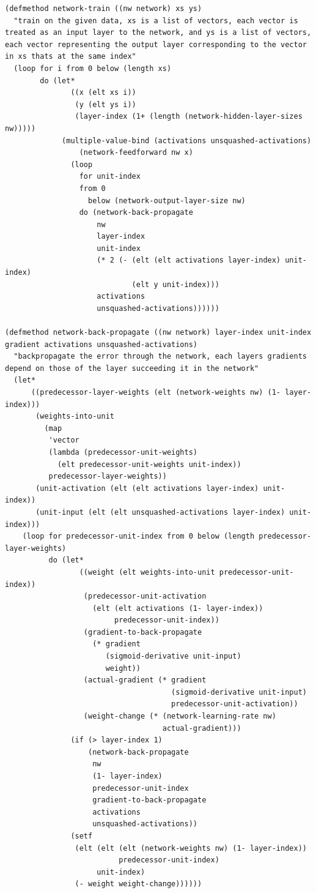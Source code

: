 \documentclass[a4paper,12pt]{article}
\begin{document}
\begin{lstlisting}
(defmethod network-train ((nw network) xs ys)
  "train on the given data, xs is a list of vectors, each vector is treated as an input layer to the network, and ys is a list of vectors, each vector representing the output layer corresponding to the vector in xs thats at the same index"
  (loop for i from 0 below (length xs)
        do (let*
               ((x (elt xs i))
                (y (elt ys i))
                (layer-index (1+ (length (network-hidden-layer-sizes nw)))))
             (multiple-value-bind (activations unsquashed-activations)
                 (network-feedforward nw x)
               (loop
                 for unit-index
                 from 0
                   below (network-output-layer-size nw)
                 do (network-back-propagate
                     nw
                     layer-index
                     unit-index
                     (* 2 (- (elt (elt activations layer-index) unit-index)
                             (elt y unit-index)))
                     activations
                     unsquashed-activations))))))

(defmethod network-back-propagate ((nw network) layer-index unit-index gradient activations unsquashed-activations)
  "backpropagate the error through the network, each layers gradients depend on those of the layer succeeding it in the network"
  (let*
      ((predecessor-layer-weights (elt (network-weights nw) (1- layer-index)))
       (weights-into-unit
         (map
          'vector
          (lambda (predecessor-unit-weights)
            (elt predecessor-unit-weights unit-index))
          predecessor-layer-weights))
       (unit-activation (elt (elt activations layer-index) unit-index))
       (unit-input (elt (elt unsquashed-activations layer-index) unit-index)))
    (loop for predecessor-unit-index from 0 below (length predecessor-layer-weights)
          do (let*
                 ((weight (elt weights-into-unit predecessor-unit-index))
                  (predecessor-unit-activation
                    (elt (elt activations (1- layer-index))
                         predecessor-unit-index))
                  (gradient-to-back-propagate
                    (* gradient
                       (sigmoid-derivative unit-input)
                       weight))
                  (actual-gradient (* gradient
                                      (sigmoid-derivative unit-input)
                                      predecessor-unit-activation))
                  (weight-change (* (network-learning-rate nw)
                                    actual-gradient)))
               (if (> layer-index 1)
                   (network-back-propagate
                    nw
                    (1- layer-index)
                    predecessor-unit-index
                    gradient-to-back-propagate
                    activations
                    unsquashed-activations))
               (setf
                (elt (elt (elt (network-weights nw) (1- layer-index))
                          predecessor-unit-index)
                     unit-index)
                (- weight weight-change))))))
\end{lstlisting}
\end{document}
